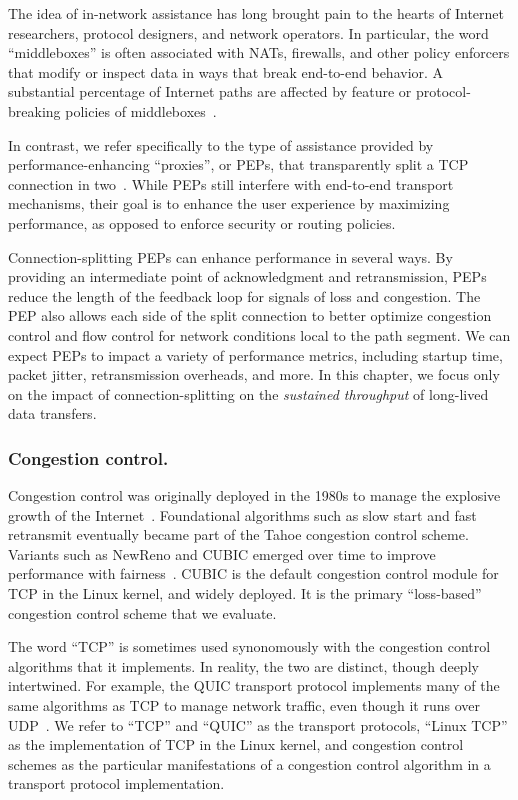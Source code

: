 The idea of in-network assistance has long brought pain to the hearts of
Internet researchers, protocol designers, and network operators. In particular,
the word ``middleboxes'' is often associated with NATs, firewalls, and other
policy enforcers that modify or inspect data in ways that break end-to-end
behavior. A substantial percentage of Internet paths are affected by feature or
protocol-breaking policies of middleboxes~\cite{edeline2019bottomup}.

In contrast, we refer specifically to the type of assistance provided by
performance-enhancing ``proxies'', or PEPs, that transparently split a TCP
connection in two~\cite{rfc3135}. While PEPs still interfere with end-to-end
transport mechanisms, their goal is to enhance the user experience by
maximizing performance, as opposed to enforce security or routing policies.

Connection-splitting PEPs can enhance performance in several ways. By providing
an intermediate point of acknowledgment and retransmission, PEPs reduce the
length of the feedback loop for signals of loss and congestion. The PEP also
allows each side of the split connection to better optimize congestion control
and flow control for network conditions local to the path segment. We can
expect PEPs to impact a variety of performance metrics, including startup time,
packet jitter, retransmission overheads, and more. In this chapter, we focus
only on the impact of connection-splitting on the \textit{sustained throughput}
of long-lived data transfers.

\subsubsection{Congestion control.}

Congestion control was originally deployed in the 1980s to manage the explosive
growth of the Internet~\cite{vjk}. Foundational algorithms such as slow start
and fast retransmit eventually became part of the Tahoe congestion control
scheme. Variants such as NewReno and CUBIC emerged over time to improve
performance with fairness~\cite{ha2008cubic}. CUBIC is the default congestion control module for
TCP in the Linux kernel, and widely deployed. It is the primary ``loss-based''
congestion control scheme that we evaluate.

The word ``TCP'' is sometimes used synonomously with the congestion control
algorithms that it implements. In reality, the two are distinct, though deeply
intertwined. For example, the QUIC transport protocol implements many of the
same algorithms as TCP to manage network traffic, even though it runs over UDP~\cite{rfc9000}.
We refer to ``TCP'' and ``QUIC'' as the transport protocols,
``Linux TCP'' as the implementation of TCP in the Linux kernel, and congestion
control schemes as the particular manifestations of a congestion control
algorithm in a transport protocol implementation.

